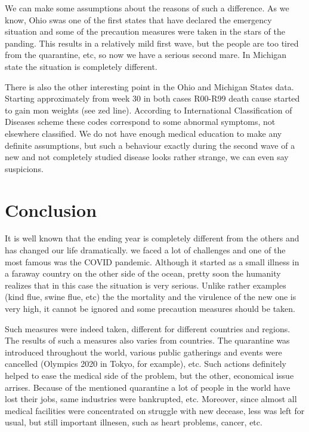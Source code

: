 \documentclass[conference]{IEEEtran}
\begin{document}
We  can make some assumptions about the reasons of such a difference. As we know, Ohio swas one of the first states that have declared the emergency situation and some of the precaution measures were taken in the stars of the panding. This results in a relatively mild first wave, but the people are too tired from the quarantine, etc, so now we have a serious second mare. In Michigan state the situation is completely different.

There is also the other interesting point in the Ohio and Michigan States data. Starting approximately from week 30 in both cases R00-R99 death cause started to gain mon weights (see zed line). According to  International Classification of Diseases scheme  \cite{ICD-10} these codes correspond to some abnormal symptoms, not elsewhere classified. We do not have enough medical education to make any definite assumptions, but such a behaviour exactly during the second wave of a new and not completely studied disease looks rather strange, we can even say suspicions.




\section{Conclusion}

It is well known that the ending year is completely different from the others and has changed our life dramatically. we faced a lot of challenges and one of the most famous was the COVID pandemic. Although it started as a small illness in a faraway country on the other side of the ocean, pretty soon the humanity realizes that in this case the situation is very serious. Unlike rather examples (kind flue, swine flue, etc) the the mortality and the virulence of the new one is very high, it cannot be ignored and some precaution measures should be taken.

Such measures were indeed taken, different for different countries and regions. The results of such a measures also varies from countries. The quarantine was introduced throughout the world, various public gatherings and events were cancelled (Olympics 2020 in Tokyo, for example), etc. Such actions definitely helped to ease the medical side of the problem, but the other, economical issue arrises. Because of the mentioned quarantine a lot of people in the world have lost their jobs, same industries were bankrupted, etc. Moreover, since almost all medical facilities were concentrated on struggle with new decease, less was left for usual, but still important illnesen, such as heart problems, cancer, etc.
\end{document}
